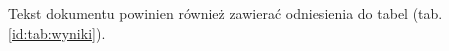 \documentclass[a4paper,twoside,12pt]{book}
\begin{document}
%
%
%
%
%        


Tekst dokumentu powinien również zawierać odniesienia do tabel (tab. \ref{id:tab:wyniki}).
\end{document}
